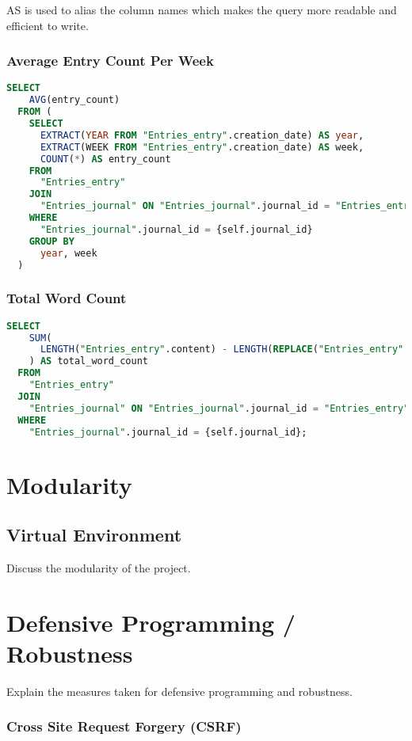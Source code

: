 AS is used to alias the column names which makes the query more readable and efficient to write.

\subsubsection{Average Entry Count Per Week}
\begin{lstlisting}[language=SQL]
  SELECT
    AVG(entry_count)
  FROM (
    SELECT
      EXTRACT(YEAR FROM "Entries_entry".creation_date) AS year,
      EXTRACT(WEEK FROM "Entries_entry".creation_date) AS week,
      COUNT(*) AS entry_count
    FROM
      "Entries_entry"
    JOIN
      "Entries_journal" ON "Entries_journal".journal_id = "Entries_entry".journal_id_id
    WHERE
      "Entries_journal".journal_id = {self.journal_id}
    GROUP BY
      year, week
  )
\end{lstlisting}

\subsubsection{Total Word Count}
\begin{lstlisting}[language=SQL]
SELECT
    SUM(
      LENGTH("Entries_entry".content) - LENGTH(REPLACE("Entries_entry".content, ' ', '')) + 1
    ) AS total_word_count
  FROM
    "Entries_entry"
  JOIN
    "Entries_journal" ON "Entries_journal".journal_id = "Entries_entry".journal_id_id
  WHERE
    "Entries_journal".journal_id = {self.journal_id};
\end{lstlisting}

\section{Modularity}


\subsection{Virtual Environment}
Discuss the modularity of the project.

\section{Defensive Programming / Robustness}
Explain the measures taken for defensive programming and robustness.


\subsubsection{Cross Site Request Forgery (CSRF)}

